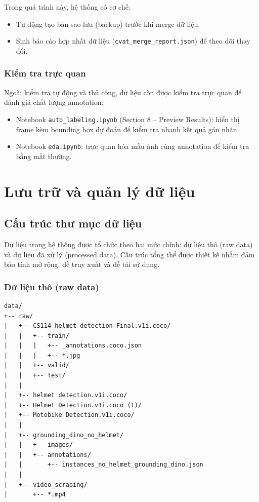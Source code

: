 Trong quá trình này, hệ thống có cơ chế:

\begin{itemize}
    \item Tự động tạo bản sao lưu (backup) trước khi merge dữ liệu.
    \item Sinh báo cáo hợp nhất dữ liệu (\texttt{cvat\_merge\_report.json}) để theo dõi thay đổi.
\end{itemize}

\subsubsection{Kiểm tra trực quan}

Ngoài kiểm tra tự động và thủ công, dữ liệu còn được kiểm tra trực quan để đánh giá chất lượng annotation:

\begin{itemize}
    \item Notebook \texttt{auto\_labeling.ipynb} (Section 8 – Preview Results): hiển thị frame kèm bounding box dự đoán để kiểm tra nhanh kết quả gán nhãn.
    \item Notebook \texttt{eda.ipynb}: trực quan hóa mẫu ảnh cùng annotation để kiểm tra bằng mắt thường.
\end{itemize}

\section{Lưu trữ và quản lý dữ liệu}

\subsection{Cấu trúc thư mục dữ liệu}

Dữ liệu trong hệ thống được tổ chức theo hai mức chính: dữ liệu thô (raw data) và dữ liệu đã xử lý (processed data). Cấu trúc tổng thể được thiết kế nhằm đảm bảo tính mở rộng, dễ truy xuất và dễ tái sử dụng.

\subsubsection{Dữ liệu thô (raw data)}

\begin{verbatim}
data/
+-- raw/
|   +-- CS114_helmet_detection_Final.v1i.coco/
|   |   +-- train/
|   |   |   +-- _annotations.coco.json
|   |   |   +-- *.jpg
|   |   +-- valid/
|   |   +-- test/
|   |
|   +-- helmet detection.v1i.coco/
|   +-- Helmet Detection.v1i.coco (1)/
|   +-- Motobike Detection.v1i.coco/
|   |
|   +-- grounding_dino_no_helmet/
|   |   +-- images/
|   |   +-- annotations/
|   |       +-- instances_no_helmet_grounding_dino.json
|   |
|   +-- video_scraping/
|       +-- *.mp4
\end{verbatim}

